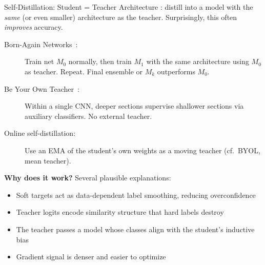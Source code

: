 \begin{frame}{Self-Distillation: Student = Teacher Architecture}
  : distill into a model with the \emph{same} (or even smaller) architecture as the teacher. Surprisingly, this often \emph{improves} accuracy.

  \vspace{0.3em}
  \begin{description}
    \item[Born-Again Networks~\cite{furlanello2018born}:] Train net $M_0$ normally, then train $M_1$ with the same architecture using $M_0$ as teacher. Repeat. Final ensemble or $M_k$ outperforms $M_0$.
    \item[Be Your Own Teacher~\cite{zhang2019selfdistillation}:] Within a single CNN, deeper sections supervise shallower sections via auxiliary classifiers. No external teacher.
    \item[Online self-distillation:] Use an EMA of the student's own weights as a moving teacher (cf.\ BYOL, mean teacher).
  \end{description}

  \vspace{0.3em}
  \textbf{Why does it work?} Several plausible explanations:
  \begin{itemize}[nosep]
    \item Soft targets act as data-dependent label smoothing, reducing overconfidence
    \item Teacher logits encode similarity structure that hard labels destroy
    \item The teacher passes a model whose classes align with the student's inductive bias
    \item Gradient signal is denser and easier to optimize
  \end{itemize}
\end{frame}

